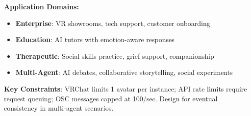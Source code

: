 \documentclass[11pt,letterpaper]{article}
\begin{document}
\begin{tcolorbox}[
  enhanced,
  colback=vcprimary!5,
  colframe=vcprimary!50,
  boxrule=1pt,
  arc=6pt,
  title={\textcolor{white}{\sffamily\bfseries Part V.5 Summary: Applications \& Multi-Agent}},
  colbacktitle=vcprimary,
  partsummary
]
\small
\textbf{Application Domains:}
\begin{itemize}[nosep, leftmargin=1.5em]
  \item \textbf{Enterprise}: VR showrooms, tech support, customer onboarding
  \item \textbf{Education}: AI tutors with emotion-aware responses
  \item \textbf{Therapeutic}: Social skills practice, grief support, companionship
  \item \textbf{Multi-Agent}: AI debates, collaborative storytelling, social experiments
\end{itemize}

\vspace{0.3cm}
\textbf{Key Constraints}: VRChat limits 1 avatar per instance; API rate limits require request queuing; OSC messages capped at 100/sec. Design for eventual consistency in multi-agent scenarios.
\end{tcolorbox}
\end{document}
